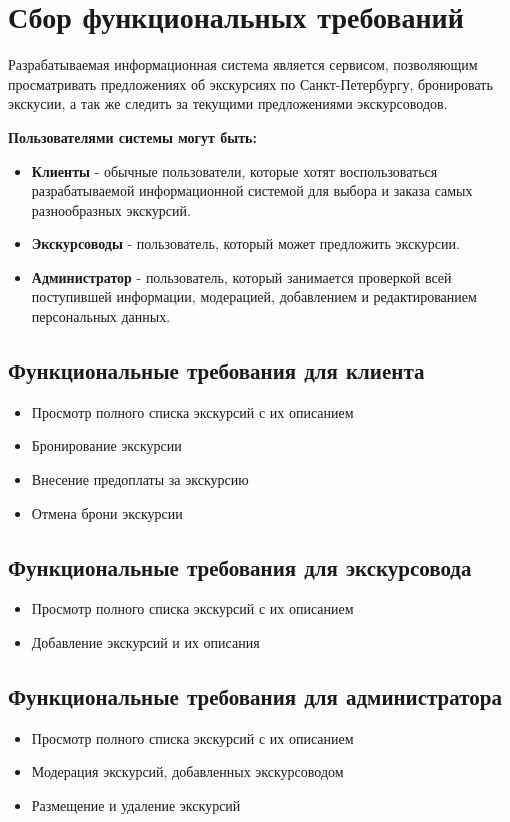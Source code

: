 \documentclass[12pt,a4paper]{article}
\begin{document}
\newpage
\tableofcontents
\newpage
\section{Сбор функциональных требований}
Разрабатываемая информационная система является сервисом, позволяющим просматривать предложениях об экскурсиях по Санкт-Петербургу, бронировать экскусии, а так же следить за текущими предложениями экскурсоводов.

\textbf{Пользователями системы могут быть:}
\begin{itemize}
\item \textbf{Клиенты} - обычные пользователи, которые хотят воспользоваться разрабатываемой информационной системой для выбора и заказа самых разнообразных экскурсий.
\item \textbf{Экскурсоводы} - пользователь, который может предложить экскурсии.
\item \textbf{Администратор}  -  пользователь, который занимается проверкой всей поступившей информации, модерацией, добавлением и редактированием персональных данных.
\end{itemize}
\subsection{Функциональные требования для клиента}
\begin{itemize}
\item Просмотр полного списка экскурсий с их описанием
\item Бронирование экскурсии
\item Внесение предоплаты за экскурсию
\item Отмена брони экскурсии
\end{itemize}
\subsection{Функциональные требования для экскурсовода}
\begin{itemize}
\item Просмотр полного списка экскурсий с их описанием
\item Добавление экскурсий и их описания
\end{itemize}
\subsection{Функциональные требования для администратора}
\begin{itemize}
\item Просмотр полного списка экскурсий с их описанием
\item Модерация экскурсий, добавленных экскурсоводом
\item Размещение и удаление экскурсий 
\end{itemize}
\newpage
\end{document}
